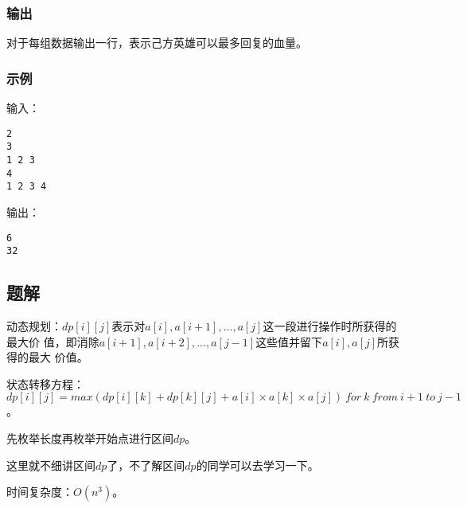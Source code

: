 \subsubsection{输出}
对于每组数据输出一行，表示己方英雄可以最多回复的血量。

\subsubsection{示例}
输入：
\begin{lstlisting}
2
3
1 2 3
4
1 2 3 4
\end{lstlisting}

输出：
\begin{lstlisting}
6
32
\end{lstlisting}

\subsection{题解}
动态规划：$dp[i][j]$表示对$a[i],a[i + 1],...,a[j]$这一段进行操作时所获得的最大价
值，即消除$a[i + 1],a[i + 2], ..., a[j - 1]$这些值并留下$a[i], a[j]$所获得的最大
价值。

状态转移方程：$dp[i][j] = max(dp[i][k] + dp[k][j] + a[i]\times a[k] \times a[j])
\ for \ k \ from \ i + 1 \ to \ j - 1$。

先枚举长度再枚举开始点进行区间$dp$。

这里就不细讲区间$dp$了，不了解区间$dp$的同学可以去学习一下。

时间复杂度：$O(n^3)$。

